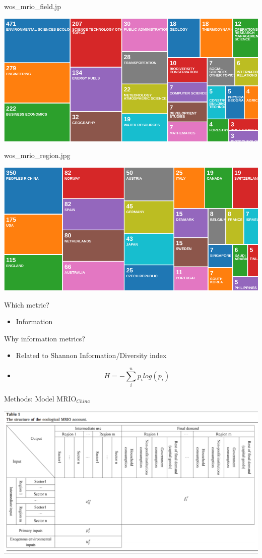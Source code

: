 \documentclass[aspectratio=169]{beamer}
\begin{document}
\begin{frame}{wos\_mrio\_field.jp}

\begin{center}\includegraphics[width=0.5\linewidth]{images/wos_mrio_field} \end{center}

\end{frame}

\begin{frame}{wos\_mrio\_region.jpg}

\begin{center}\includegraphics[width=0.5\linewidth]{images/wos_mrio_region} \end{center}

\end{frame}

\begin{frame}{Which metric?}

\begin{itemize}
\item
  Information
\end{itemize}

\end{frame}

\begin{frame}{Why information metrics?}

\begin{itemize}
\item
  Related to Shannon Information/Diversity index
\item
  \[H = -\sum_i^n p_i log(p_i)\]
\end{itemize}

\end{frame}

\begin{frame}{Methods: Model MRIO\(_{China}\)}

\begin{center}\includegraphics[width=0.5\linewidth]{images/Wu_2018_Table1} \end{center}

\end{frame}
\end{document}
